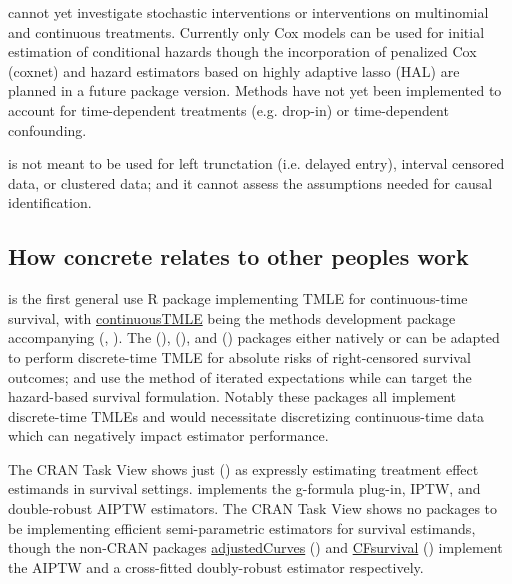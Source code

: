 \documentclass{report}
\newcommand{\1}{\ensuremath{\mathbf{1}}}
\begin{document}
 cannot yet investigate stochastic interventions or interventions on multinomial and continuous treatments. Currently only Cox models can be used for initial estimation of conditional hazards though the incorporation of penalized Cox (coxnet) and hazard estimators based on highly adaptive lasso (HAL) are planned in a future package version. Methods have not yet been implemented to account for time-dependent treatments (e.g. drop-in) or time-dependent confounding.

 is not meant to be used for left trunctation (i.e. delayed entry), interval censored data, or clustered data; and it cannot assess the assumptions needed for causal identification. 

\subsection{How concrete relates to other peoples work}
\label{sec:orgfcc282a}
 is the first general use R package implementing TMLE for continuous-time survival, with \href{https://github.com/helenecharlotte/continuousTMLE}{continuousTMLE} being the methods development package accompanying (\cite{rytgaard_one-step_2021}, \cite{rytgaard_continuous-time_2021}). The  (\cite{schwab_ltmle_2020}),  (\cite{sofrygin_stremr_2017}), and  (\cite{benkeser_survtmle_2019}) packages either natively or can be adapted to perform discrete-time TMLE for absolute risks of right-censored survival outcomes;  and  use the method of iterated expectations while  can target the hazard-based survival formulation. Notably these packages all implement discrete-time TMLEs and would necessitate discretizing continuous-time data which can negatively impact estimator performance. 

The  CRAN Task View shows just  (\cite{gerds_riskregression_2022}) as expressly estimating treatment effect estimands in survival settings.  implements the g-formula plug-in, IPTW, and double-robust AIPTW estimators. The  CRAN Task View shows no packages to be implementing efficient semi-parametric estimators for survival estimands, though the non-CRAN  packages \href{https://github.com/RobinDenz1/adjustedCurves}{adjustedCurves} (\cite{denz_comparison_2022}) and \href{https://github.com/tedwestling/CFsurvival}{CFsurvival} (\cite{westling_inference_2021}) implement the AIPTW and a cross-fitted doubly-robust estimator respectively. 
\end{document}

